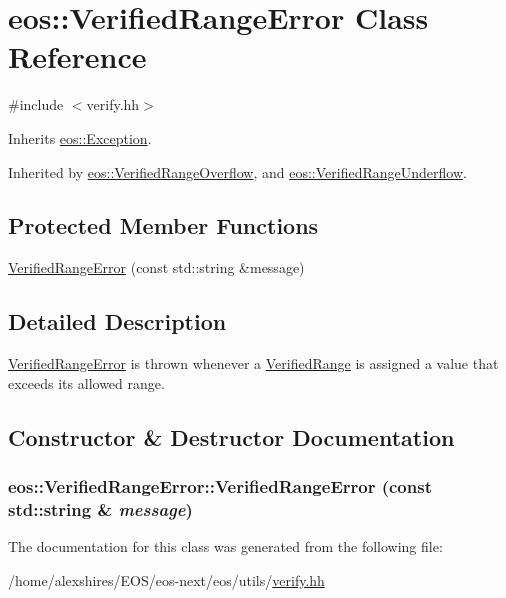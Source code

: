 \hypertarget{classeos_1_1VerifiedRangeError}{
\section{eos::VerifiedRangeError Class Reference}
\label{classeos_1_1VerifiedRangeError}
}


{\ttfamily \#include $<$verify.hh$>$}

Inherits \hyperlink{classeos_1_1Exception}{eos::Exception}.

Inherited by \hyperlink{structeos_1_1VerifiedRangeOverflow}{eos::VerifiedRangeOverflow}, and \hyperlink{structeos_1_1VerifiedRangeUnderflow}{eos::VerifiedRangeUnderflow}.\subsection*{Protected Member Functions}
\begin{DoxyCompactItemize}
\item 
\hyperlink{classeos_1_1VerifiedRangeError_a68d9494a951b7945d19a13a9bef0e456}{VerifiedRangeError} (const std::string \&message)
\end{DoxyCompactItemize}


\subsection{Detailed Description}
\hyperlink{classeos_1_1VerifiedRangeError}{VerifiedRangeError} is thrown whenever a \hyperlink{classeos_1_1VerifiedRange}{VerifiedRange} is assigned a value that exceeds its allowed range. 

\subsection{Constructor \& Destructor Documentation}
\hypertarget{classeos_1_1VerifiedRangeError_a68d9494a951b7945d19a13a9bef0e456}{
\subsubsection[{VerifiedRangeError}]{\setlength{\rightskip}{0pt plus 5cm}eos::VerifiedRangeError::VerifiedRangeError (const std::string \& {\em message})}}
\label{classeos_1_1VerifiedRangeError_a68d9494a951b7945d19a13a9bef0e456}


The documentation for this class was generated from the following file:\begin{DoxyCompactItemize}
\item 
/home/alexshires/EOS/eos-\/next/eos/utils/\hyperlink{verify_8hh}{verify.hh}\end{DoxyCompactItemize}
